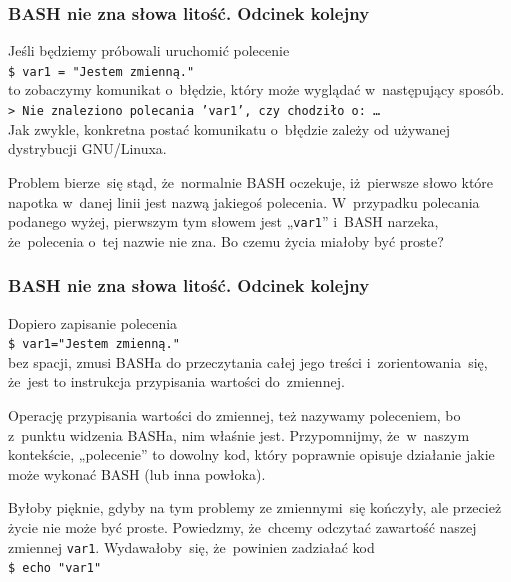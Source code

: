 \documentclass[10pt,t]{beamer}
\begin{document}
\begin{frame}
  \frametitle{BASH nie zna słowa litość. Odcinek kolejny}


  Jeśli będziemy próbowali uruchomić polecenie \\
  \texttt{\$ var1 = "Jestem zmienną."} \\
  to zobaczymy komunikat o~błędzie, który może wyglądać w~następujący
  sposób. \\
  \texttt{> Nie znaleziono polecania 'var1', czy chodziło~o: \ldots} \\
  Jak zwykle, konkretna postać komunikatu o~błędzie zależy od używanej
  dystrybucji GNU/Linuxa.

  Problem bierze~się stąd, że~normalnie BASH oczekuje, iż~pierwsze słowo
  które napotka w~danej linii jest nazwą jakiegoś polecenia. W~przypadku
  polecania podanego wyżej, pierwszym tym słowem jest „\texttt{var1}” i~BASH
  narzeka, że~polecenia o~tej nazwie nie zna. Bo czemu życia miałoby być
  proste?

\end{frame}





\begin{frame}
  \frametitle{BASH nie zna słowa litość. Odcinek kolejny}


  Dopiero zapisanie polecenia \\
  \texttt{\$ var1="Jestem zmienną."} \\
  bez spacji, zmusi BASHa do przeczytania całej jego treści
  i~zorientowania~się, że~jest to instrukcja przypisania wartości
  do~zmiennej.

  Operację przypisania wartości do zmiennej, też nazywamy poleceniem,
  bo z~punktu widzenia BASHa, nim właśnie jest. Przypomnijmy, że~w~naszym
  kontekście, „polecenie” to dowolny kod, który poprawnie opisuje działanie
  jakie może wykonać BASH (lub inna powłoka).

  Byłoby pięknie, gdyby na tym problemy ze zmiennymi~się kończyły, ale
  przecież życie nie może być proste. Powiedzmy, że~chcemy odczytać
  zawartość naszej zmiennej \texttt{var1}. Wydawałoby~się, że~powinien
  zadziałać kod \\
  \texttt{\$ echo "var1"}

\end{frame}
\end{document}
